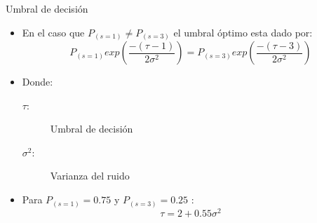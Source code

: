 \documentclass[xcolor=table]{beamer}
\begin{document}
\begin{frame}{Umbral de decisión}
    \begin{itemize}
        \item En el caso que $P_{(s=1)} \neq P_{(s=3)}$ el umbral óptimo esta dado por:
            \begin{equation}
            P_{(s=1)} exp{(\frac{-(\tau-1)}{2{\sigma}^{2}})} =  P_{(s=3)} exp{(\frac{-(\tau-3)}{2{\sigma}^{2}})}
            \end{equation}
    \item Donde:
    \begin{description}
    \item [$\tau:$] Umbral de decisión
    \item [$\sigma^2:$] Varianza del ruido
    \end{description}
    \item Para $P_{(s=1)}=0.75$ y $P_{(s=3)}=0.25$ :
    \begin{equation*}
         \tau = 2 + 0.55  {\sigma}^{2}
    \end{equation*}
    \end{itemize}
\end{frame}
\end{document}
